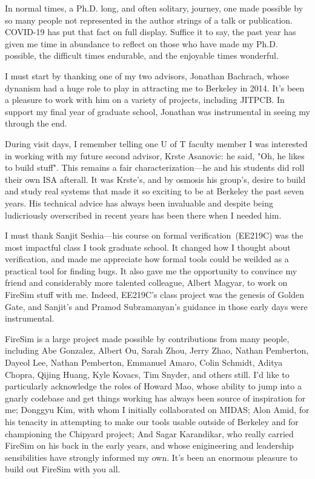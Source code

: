 In normal times, a Ph.D. long, and often solitary, journey, one made possible
by so many people not represented in the author strings of a talk or publication.
COVID-19 has put that fact on full display.
Suffice it to say, the past year has given me time in abundance to reflect on
those who have made my Ph.D. possible, the difficult times
endurable, and the enjoyable times wonderful.

I must start by thanking one of my two advisors, Jonathan Bachrach, whose dynanism had a
huge role to play in attracting me to Berkeley in 2014. It's been a pleasure to
work with him on a variety of projects, including JITPCB. In support my final
year of graduate school, Jonathan was instrumental in seeing my through the
end.

During visit days, I remember telling one U of T faculty member I was
interested in working with my future second advisor, Krste Asanovic: he said,
"Oh, he likes to build stuff". This remains a fair characterization---he and
his students did roll their own ISA afterall. It was Krste's, and by osmosis
his group's, desire to build and study real systems that made it so exciting to
be at Berkeley the past seven years. His technical advice has always been
invaluable and despite being ludicriously overscribed in recent years has been
there when I needed him.

I must thank Sanjit Seshia---his course on formal verification~(EE219C) was the
most impactful class I took graduate school. It changed how I thought about
verification, and made me appreciate how formal tools could be weilded as a practical
tool for finding bugs. It also gave me the opportunity to convince my friend and
considerably more talented colleague, Albert Magyar, to work on FireSim stuff
with me. Indeed, EE219C's class project was the genesis of Golden Gate, and
Sanjit's and Pramod Subramanyan's guidance in those early days were instrumental.

FireSim is a large project made possible by contributions from many people,
including Abe Gonzalez, Albert Ou, Sarah Zhou, Jerry Zhao, Nathan Pemberton,
Dayeol Lee, Nathan Pemberton, Emmanuel Amaro, Colin Schmidt, Aditya Chopra,
Qijing Huang, Kyle Kovacs, Tim Snyder, and others still. I'd like to
particularly acknowledge the roles of Howard Mao, whose ability to jump into a gnarly codebase and
get things working has always been source of inspiration for me; Donggyu Kim,
with whom I initially collaborated on MIDAS; Alon Amid, for his tenacity in
attempting to make our tools usable outside of Berkeley and for championing the
Chipyard project; And Sagar Karandikar, who really carried FireSim on
his back in the early years, and whose enigineering and leadership
sensibilities have strongly informed my own. It's been an enormous pleasure to build out FireSim with you all.

